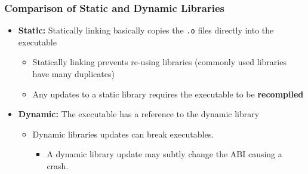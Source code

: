 \subsubsection{Comparison of Static and Dynamic Libraries}
\begin{notes}
    \begin{itemize}
        \item \textbf{Static:} Statically linking basically copies the \texttt{.o} files directly into the executable
        \begin{itemize}
            \item Statically linking prevents re-using libraries (commonly used libraries have many duplicates)
            \item Any updates to a static library requires the executable to be \textbf{recompiled}
        \end{itemize}
        \item \textbf{Dynamic:} The executable has a reference to the dynamic library
        \begin{itemize}
            \item Dynamic libraries updates can break executables.
            \begin{itemize}
                \item A dynamic library update may subtly change the ABI causing a crash.
            \end{itemize}
        \end{itemize}
    \end{itemize}
\end{notes}

